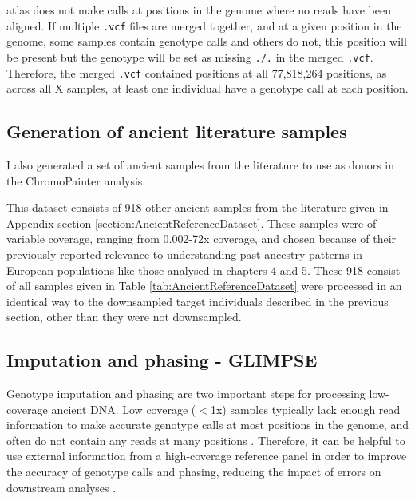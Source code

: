 {atlas does not make calls at positions in the genome where no reads have been aligned. If multiple \texttt{.vcf} files are merged together, and at a given position in the genome, some samples contain genotype calls and others do not, this position will be present but the genotype will be set as missing \texttt{./.} in  the merged \texttt{.vcf}. Therefore, the merged \texttt{.vcf} contained positions at all 77,818,264 positions, as across all X samples, at least one individual have a genotype call at each position. 

\subsection{Generation of ancient literature samples} \label{AncientReferenceSamples}

I also generated a set of ancient samples from the literature to use as donors in the ChromoPainter analysis.

This dataset consists of 918 other ancient samples from the literature given in Appendix section \ref{section:AncientReferenceDataset}. These samples were of variable coverage, ranging from 0.002-72x coverage, and chosen because of their previously reported relevance to understanding past ancestry patterns in European populations like those analysed in chapters 4 and 5. These 918 consist of all samples given in Table \ref{tab:AncientReferenceDataset} were processed in an identical way to the downsampled target individuals described in the previous section, other than they were not downsampled.  

\subsection{Imputation and phasing - GLIMPSE}

Genotype imputation and phasing are two important steps for processing low-coverage ancient DNA. Low coverage ($<$1x) samples typically lack enough read information to make accurate genotype calls at most positions in the genome, and often do not contain any reads at many positions \cite{nielsen2011genotype}. Therefore, it can be helpful to use external information from a high-coverage reference panel in order to improve the accuracy of genotype calls and phasing, reducing the impact of errors on downstream analyses \cite{rubinacci2021efficient}. 

}
